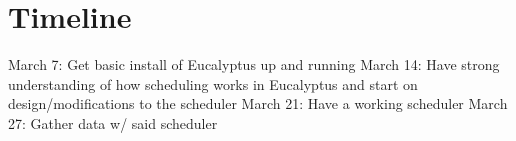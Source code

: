 \section{Timeline}
March 7: Get basic install of Eucalyptus up and running
March 14: Have strong understanding of how scheduling works in Eucalyptus and start on design/modifications to the scheduler
March 21: Have a working scheduler
March 27: Gather data w/ said scheduler
